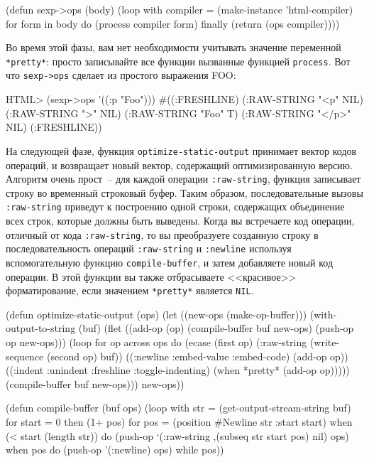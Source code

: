 \begin{myverb}
(defun sexp->ops (body)
  (loop with compiler = (make-instance 'html-compiler)
     for form in body do (process compiler form)
     finally (return (ops compiler))))
\end{myverb}

Во время этой фазы, вам нет необходимости учитывать значение переменной \lstinline{*pretty*}:
просто записывайте все функции вызванные функцией \lstinline{process}.  Вот что
\lstinline{sexp->ops} сделает из простого выражения FOO:

\begin{myverb}
  HTML> (sexp->ops '((:p "Foo")))
  #((:FRESHLINE) (:RAW-STRING "<p" NIL) (:RAW-STRING ">" NIL)
    (:RAW-STRING "Foo" T) (:RAW-STRING "</p>" NIL) (:FRESHLINE))
\end{myverb}

На следующей фазе, функция \lstinline{optimize-static-output} принимает вектор кодов операций,
и возвращает новый вектор, содержащий оптимизированную версию.  Алгоритм очень прост~--
для каждой операции \lstinline{:raw-string}, функция записывает строку во временный строковый
буфер. Таким образом, последовательные вызовы \lstinline{:raw-string} приведут к построению
одной строки, содержащих объединение всех строк, которые должны быть выведены. Когда вы
встречаете код операции, отличный от кода \lstinline{:raw-string}, то вы преобразуете созданную
строку в последовательность операций \lstinline{:raw-string} и \lstinline{:newline} используя
вспомогательную функцию \lstinline{compile-buffer}, и затем добавляете новый код операции.  В
этой функции вы также отбрасываете <<красивое>> форматирование, если значением
\lstinline{*pretty*} является \lstinline{NIL}.

\begin{myverb}
(defun optimize-static-output (ops)
  (let ((new-ops (make-op-buffer)))
    (with-output-to-string (buf)
      (flet ((add-op (op) 
               (compile-buffer buf new-ops)
               (push-op op new-ops)))
        (loop for op across ops do
             (ecase (first op)
               (:raw-string (write-sequence (second op) buf))
               ((:newline :embed-value :embed-code) (add-op op))
               ((:indent :unindent :freshline :toggle-indenting)
                (when *pretty* (add-op op)))))
        (compile-buffer buf new-ops)))
    new-ops))

(defun compile-buffer (buf ops)
  (loop with str = (get-output-stream-string buf)
     for start = 0 then (1+ pos)
     for pos = (position #\bslash{}Newline str :start start)
     when (< start (length str))
     do (push-op `(:raw-string ,(subseq str start pos) nil) ops)
     when pos do (push-op '(:newline) ops)
     while pos))
\end{myverb}

